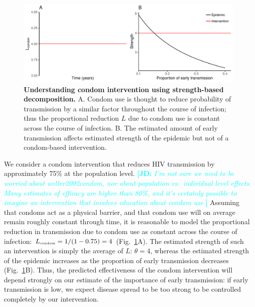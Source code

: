 \documentclass[12pt]{article}\usepackage[]{graphicx}\usepackage[]{color}
\newcommand{\comment}[3]{\textcolor{#1}{\textbf{[#2: }\textit{#3}\textbf{]}}}
\newcommand{\jd}[1]{\comment{cyan}{JD}{#1}}
\newcommand{\tsub}[2]{#1_{{\textrm{\tiny #2}}}}
\newcommand{\figref}[1]{Fig.~\ref{fig:#1}}
\newcommand{\figlab}[1]{\label{fig:#1}}
\begin{document}
\begin{figure}[!t]
\includegraphics[width=\textwidth]{../figure/figure2.pdf}
\caption{
\textbf{Understanding condom intervention using strength-based decomposition.}
A. Condom use is thought to reduce probability of transmission by a similar factor throughout the course of infection; thus the proportional reduction $L$ due to condom use is constant across the course of infection. 
B. The estimated amount of early transmission affects estimated strength of the epidemic but not of a condom-based intervention.
}
\figlab{condom}
\end{figure}

We consider a condom intervention that reduces HIV transmission by approximately 75\% at the population level. \jd{I'm not sure we need to be worried about weller2002condom, nor about population vs.~individual level effects. Many estimates of efficacy are higher than 80\%, and it's certainly possible to imagine an intervention that involves education about condom use.}
Assuming that condoms act as a physical barrier, and that condom use will on average remain roughly constant through time, it is reasonable to model the proportional reduction in transmission due to condom use as constant across the course of infection: $\tsub{L}{condom} = 1/(1-0.75) = 4$  (\figref{condom}A).
The estimated strength of such an intervention is simply the average of $L$: $\theta=4$, whereas the estimated strength of the epidemic increases as the proportion of early transmission decreases (\figref{condom}B).
Thus, the predicted effectiveness of the condom intervention will depend strongly on our estimate of the importance of early transmission: if early transmission is low, we expect disease spread to be too strong to be controlled completely by our intervention. 
\end{document}

